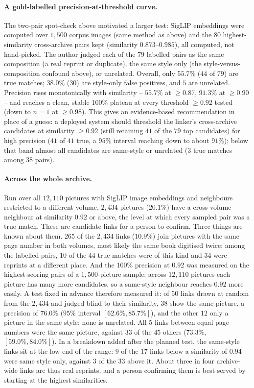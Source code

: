 \documentclass[12pt,a4paper]{report}
\begin{document}
\paragraph{A gold-labelled precision-at-threshold curve.} The two-pair spot-check above motivated a larger test: SigLIP embeddings were computed over $1{,}500$ corpus images (same method as above) and the $80$ highest-similarity cross-archive pairs kept (similarity $0.873$--$0.985$), all computed, not hand-picked. The author judged each of the $79$ labelled pairs as the same composition (a real reprint or duplicate), the same style only (the style-versus-composition confound above), or unrelated. Overall, only $55.7\%$ ($44$ of $79$) are true matches; $38.0\%$ ($30$) are style-only false positives, and $5$ are unrelated. Precision rises monotonically with similarity -- $55.7\%$ at $\ge 0.87$, $91.3\%$ at $\ge 0.90$ -- and reaches a clean, stable $100\%$ plateau at every threshold $\ge 0.92$ tested (down to $n=1$ at $\ge 0.98$). This gives an evidence-based recommendation in place of a guess: a deployed system should threshold the linker's cross-archive candidates at similarity $\ge 0.92$ (still retaining $41$ of the $79$ top candidates) for high precision ($41$ of $41$ true, a $95\%$ interval reaching down to about $91\%$); below that band almost all candidates are same-style or unrelated ($3$ true matches among $38$ pairs).

\paragraph{Across the whole archive.} Run over all $12{,}110$ pictures with SigLIP image embeddings and neighbours restricted to a different volume, $2{,}434$ pictures ($20.1\%$) have a cross-volume neighbour at similarity $0.92$ or above, the level at which every sampled pair was a true match. These are candidate links for a person to confirm. Three things are known about them. $265$ of the $2{,}434$ links ($10.9\%$) join pictures with the same page number in both volumes, most likely the same book digitised twice; among the labelled pairs, $10$ of the $44$ true matches were of this kind and $34$ were reprints at a different place. And the $100\%$ precision at $0.92$ was measured on the highest-scoring pairs of a $1{,}500$-picture sample; across $12{,}110$ pictures each picture has many more candidates, so a same-style neighbour reaches $0.92$ more easily. A test fixed in advance therefore measured it: of $50$ links drawn at random from the $2{,}434$ and judged blind to their similarity, $38$ show the same picture, a precision of $76.0\%$ ($95\%$ interval $[62.6\%, 85.7\%]$), and the other $12$ only a picture in the same style; none is unrelated. All $5$ links between equal page numbers were the same picture, against $33$ of the $45$ others ($73.3\%$, $[59.0\%, 84.0\%]$). In a breakdown added after the planned test, the same-style links sit at the low end of the range: $9$ of the $17$ links below a similarity of $0.94$ were same style only, against $3$ of the $33$ above it. About three in four archive-wide links are thus real reprints, and a person confirming them is best served by starting at the highest similarities.
\end{document}
